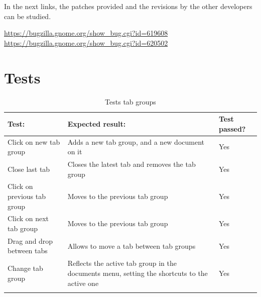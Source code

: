 In the next links,  the patches provided and the revisions by the other developers can be studied.

\noindent\url{https://bugzilla.gnome.org/show_bug.cgi?id=619608} \\
\noindent\url{https://bugzilla.gnome.org/show_bug.cgi?id=620502}

\newpage
\section{Tests}

\begin{table}[H]
  \begin{center}
    \begin{tabularx}{\textwidth}{|X|X|l|}
      \firsthline
      \textbf{Test:} & \textbf{Expected result:} & \textbf{Test passed?} \\
      \hline
      Click on new tab group & Adds a new tab group, and a new document on it & Yes \\
      \hline
      Close last tab & Closes the latest tab and removes the tab group & Yes \\
      \hline
      Click on previous tab group & Moves to the previous tab group & Yes \\
      \hline
      Click on next tab group & Moves to the previous tab group & Yes \\
      \hline
      Drag and drop between tabs & Allows to move a tab between tab groups & Yes \\
      \hline
      Change tab group & Reflects the active tab group in the documents menu, setting the shortcuts to the active one & Yes \\
      \lasthline
    \end{tabularx}
    \caption{Tests tab groups}
  \end{center}
\end{table}
